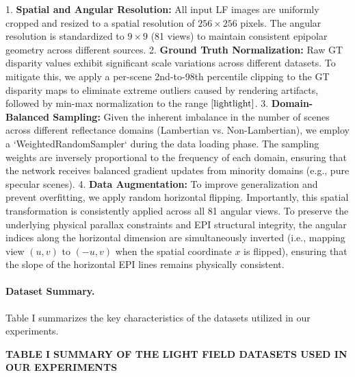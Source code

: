 \documentclass[lettersize,journal]{IEEEtran}
\begin{document}
1. \textbf{Spatial and Angular Resolution:} All input LF images are uniformly cropped and resized to a spatial resolution of $256 \times 256$ pixels. The angular resolution is standardized to $9 \times 9$ (81 views) to maintain consistent epipolar geometry across different sources.
2. \textbf{Ground Truth Normalization:} Raw GT disparity values exhibit significant scale variations across different datasets. To mitigate this, we apply a per-scene 2nd-to-98th percentile clipping to the GT disparity maps to eliminate extreme outliers caused by rendering artifacts, followed by min-max normalization to the range $\cite{lightlight}$.
3. \textbf{Domain-Balanced Sampling:} Given the inherent imbalance in the number of scenes across different reflectance domains (Lambertian vs. Non-Lambertian), we employ a `WeightedRandomSampler` during the data loading phase. The sampling weights are inversely proportional to the frequency of each domain, ensuring that the network receives balanced gradient updates from minority domains (e.g., pure specular scenes).
4. \textbf{Data Augmentation:} To improve generalization and prevent overfitting, we apply random horizontal flipping. Importantly, this spatial transformation is consistently applied across all 81 angular views. To preserve the underlying physical parallax constraints and EPI structural integrity, the angular indices along the horizontal dimension are simultaneously inverted (i.e., mapping view $(u, v)$ to $(-u, v)$ when the spatial coordinate $x$ is flipped), ensuring that the slope of the horizontal EPI lines remains physically consistent.

\paragraph{Dataset Summary.}

Table I summarizes the key characteristics of the datasets utilized in our experiments.

\textbf{TABLE I}  
\textbf{SUMMARY OF THE LIGHT FIELD DATASETS USED IN OUR EXPERIMENTS}
\end{document}
